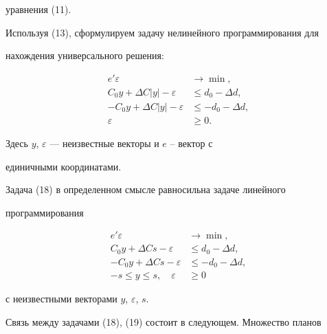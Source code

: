 уравнения (11). 


Используя (13), сформулируем задачу нелинейного программирования для 


нахождения универсального решения: 


\begin{equation} 


\begin{split} 


e'\varepsilon&\to\min,\\ 


C_0y+\Delta C|y|-\varepsilon&\le d_0-\Delta d,\\ 


-C_0y+\Delta C|y|-\varepsilon&\le -d_0-\Delta d,\\ 


\varepsilon&\ge 0. 


\end{split} 


\end{equation} 


Здесь $y$, $\varepsilon$ --- неизвестные векторы и $e$ -- вектор с 


единичными координатами. 


 


Задача (18) в определенном смысле равносильна задаче линейного 


программирования 


\begin{equation} 


\begin{split} 


e'\varepsilon&\to\min,\\ 


C_0y+\Delta C s-\varepsilon&\le d_0-\Delta d,\\ 


-C_0y+\Delta C s-\varepsilon&\le -d_0-\Delta d,\\ 


-s\le y\le s,\quad \varepsilon&\ge 0


\end{split} 


\end{equation} 


с неизвестными векторами $y$, $\varepsilon$, $s$. 


 


Связь между задачами (18), (19) состоит в следующем. Множество планов 


